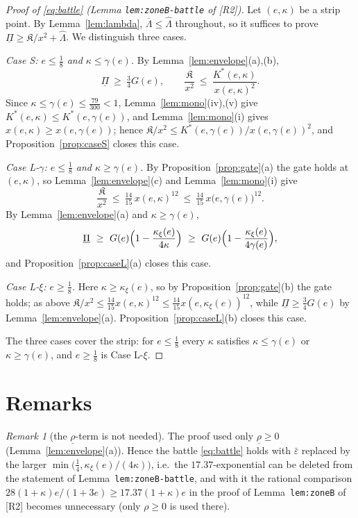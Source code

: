 \documentclass[11pt]{article}
\theoremstyle{remark}
\newtheorem{remark}[lemma]{Remark}
\newcommand{\eps}{\varepsilon}
\newcommand{\Kfrak}{\mathfrak K}
\newcommand{\Kstar}{K^{*}}
\newcommand{\kxi}{\kappa_\xi}
\newcommand{\epsbar}{\bar\eps}
\newcommand{\RII}{[R2]}
\begin{document}
\begin{proof}[Proof of \eqref{eq:battle} \textup{(Lemma
\texttt{lem:zoneB-battle} of \RII)}]
Let $(e,\kappa)$ be a strip point.  By Lemma~\ref{lem:lambda},
$\overline\Lambda\le\widehat\Lambda$ throughout, so it suffices to prove
$\underline\Pi\ge\Kfrak/x^2+\widehat\Lambda$.  We distinguish three cases.

\medskip\noindent
\emph{Case S: $e\le\tfrac18$ and $\kappa\le\gamma(e)$.}
By Lemma~\ref{lem:envelope}(a),(b),
\[
        \underline\Pi\ \ge\ \tfrac34G(e),
        \qquad
        \frac{\Kfrak}{x^2}\ \le\ \frac{\Kstar(e,\kappa)}{x(e,\kappa)^2}.
\]
Since $\kappa\le\gamma(e)\le\tfrac{79}{300}<1$, Lemma~\ref{lem:mono}(iv),(v)
give $\Kstar(e,\kappa)\le\Kstar(e,\gamma(e))$, and Lemma~\ref{lem:mono}(i)
gives $x(e,\kappa)\ge x(e,\gamma(e))$; hence
$\Kfrak/x^2\le\Kstar(e,\gamma(e))/x(e,\gamma(e))^2$, and
Proposition~\ref{prop:caseS} closes this case.

\medskip\noindent
\emph{Case L-$\gamma$: $e\le\tfrac18$ and $\kappa\ge\gamma(e)$.}
By Proposition~\ref{prop:gate}(a) the gate holds at $(e,\kappa)$, so
Lemma~\ref{lem:envelope}(c) and Lemma~\ref{lem:mono}(i) give
\[
        \frac{\Kfrak}{x^2}\ \le\ \tfrac{14}{15}\,x(e,\kappa)^{12}
        \ \le\ \tfrac{14}{15}\,x\bigl(e,\gamma(e)\bigr)^{12}.
\]
By Lemma~\ref{lem:envelope}(a) and $\kappa\ge\gamma(e)$,
\[
        \underline\Pi\ \ge\ G(e)\Bigl(1-\frac{\kxi(e)}{4\kappa}\Bigr)
        \ \ge\ G(e)\Bigl(1-\frac{\kxi(e)}{4\gamma(e)}\Bigr),
\]
and Proposition~\ref{prop:caseL}(a) closes this case.

\medskip\noindent
\emph{Case L-$\xi$: $e\ge\tfrac18$.}
Here $\kappa\ge\kxi(e)$, so by Proposition~\ref{prop:gate}(b) the gate
holds; as above
$\Kfrak/x^2\le\tfrac{14}{15}x(e,\kappa)^{12}
\le\tfrac{14}{15}x(e,\kxi(e))^{12}$, while
$\underline\Pi\ge\tfrac34G(e)$ by Lemma~\ref{lem:envelope}(a).
Proposition~\ref{prop:caseL}(b) closes this case.

\medskip
The three cases cover the strip: for $e\le\tfrac18$ every $\kappa$
satisfies $\kappa\le\gamma(e)$ or $\kappa\ge\gamma(e)$, and $e\ge\tfrac18$
is Case L-$\xi$.
\end{proof}

\section{Remarks}

\begin{remark}[the $\underline\rho$-term is not needed]\label{rmk:rho}
The proof used only $\underline\rho\ge0$
(Lemma~\ref{lem:envelope}(a)).  Hence the battle \eqref{eq:battle} holds
with $\epsbar$ replaced by the larger
$\min\bigl(\tfrac14,\kxi(e)/(4\kappa)\bigr)$, i.e.\ the
$17.37$-exponential can be deleted from the statement of
Lemma~\texttt{lem:zoneB-battle}, and with it the rational comparison
$28(1+\kappa)e/(1+3e)\ge17.37(1+\kappa)e$ in the proof of
Lemma~\texttt{lem:zoneB} of \RII{} becomes unnecessary (only
$\rho\ge0$ is used there).
\end{remark}
\end{document}
